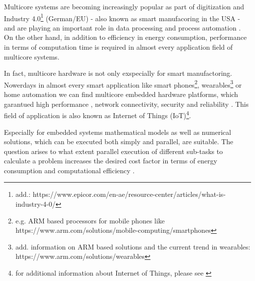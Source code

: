 Multicore systems are becoming increasingly popular as part of digitization and Industry 4.0\footnote{ add.: https://www.epicor.com/en-ae/resource-center/articles/what-is-industry-4-0/} (German/EU) \parencite{internet5} \parencite[or][]{article13} - also known as smart manufacoring in the USA \parencite[see][p1]{article12} - and are playing an important role in data processing and process automation \parencite[see][p294]{inproceedings3} \parencite[or][p1]{article11}. On the other hand, in addition to efficiency in energy consumption, performance in terms of computation time \parencite[see][p294]{inproceedings3} is required in almost every application field of multicore systems.

In fact, multicore hardware is not only exspecially for smart manufactoring. Nowerdays in almost every smart application like smart phones\footnote{ e.g. ARM based processors for mobile phones like https://www.arm.com/solutions/mobile-computing/smartphones}, wearables\footnote{ add. information on ARM based solutions and the current trend in wearables: https://www.arm.com/solutions/wearables} or home automation we can find multicore embedded hardware platforms, which garantued high performance \parencite[see][p7]{article15}, network connectivity, security and reliability \parencite[see][p5]{article16}. This field of application is also known as Internet of Things (IoT)\footnote{ for additional information about Internet of Things, please see \parencite[][]{article17}}.

Especially for embedded systems mathematical models as well as numerical solutions, which can be executed both simply and parallel, are suitable. The question arises to what extent parallel execution of different sub-tasks to calculate a problem \parencite[see][p4]{article14} increases the desired cost factor in terms of energy consumption \parencite[see][chapter 3]{inproceedings4} and computational efficiency \parencite[see][p4 Figure 3]{article14}.
